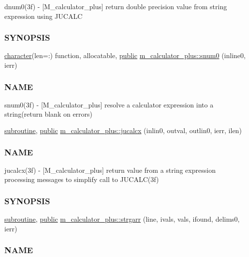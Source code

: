 \begin{DoxyCompactItemize}
\begin{DoxyCompactList}
dnum0(3f) -\/ \mbox{[}M\+\_\+calculator\+\_\+plus\mbox{]} return double precision value from string expression using J\+U\+C\+A\+LC \subsubsection*{S\+Y\+N\+O\+P\+S\+IS}\end{DoxyCompactList}\item 
\hyperlink{option__stopwatch_83_8txt_abd4b21fbbd175834027b5224bfe97e66}{character}(len=\+:) function, allocatable, \hyperlink{M__stopwatch_83_8txt_a2f74811300c361e53b430611a7d1769f}{public} \hyperlink{namespacem__calculator__plus_a2538e7f9f0b810f7f8dbdd80fa2444b3}{m\+\_\+calculator\+\_\+plus\+::snum0} (inline0, ierr)
\begin{DoxyCompactList}\small\item\em \subsubsection*{N\+A\+ME}

snum0(3f) -\/ \mbox{[}M\+\_\+calculator\+\_\+plus\mbox{]} resolve a calculator expression into a string(return blank on errors) \end{DoxyCompactList}\item 
\hyperlink{M__stopwatch_83_8txt_acfbcff50169d691ff02d4a123ed70482}{subroutine}, \hyperlink{M__stopwatch_83_8txt_a2f74811300c361e53b430611a7d1769f}{public} \hyperlink{namespacem__calculator__plus_a558a3fed7079c10085ce2f71da532d08}{m\+\_\+calculator\+\_\+plus\+::jucalcx} (inlin0, outval, outlin0, ierr, ilen)
\begin{DoxyCompactList}\small\item\em \subsubsection*{N\+A\+ME}

jucalcx(3f) -\/ \mbox{[}M\+\_\+calculator\+\_\+plus\mbox{]} return value from a string expression processing messages to simplify call to J\+U\+C\+A\+L\+C(3f) \subsubsection*{S\+Y\+N\+O\+P\+S\+IS}\end{DoxyCompactList}\item 
\hyperlink{M__stopwatch_83_8txt_acfbcff50169d691ff02d4a123ed70482}{subroutine}, \hyperlink{M__stopwatch_83_8txt_a2f74811300c361e53b430611a7d1769f}{public} \hyperlink{namespacem__calculator__plus_a4d3424e0cb74d4af53e7f59c07d31f1b}{m\+\_\+calculator\+\_\+plus\+::strgarr} (line, ivals, vals, ifound, delims0, ierr)
\begin{DoxyCompactList}\small\item\em \subsubsection*{N\+A\+ME}


\end{DoxyCompactList}
\end{DoxyCompactItemize}
